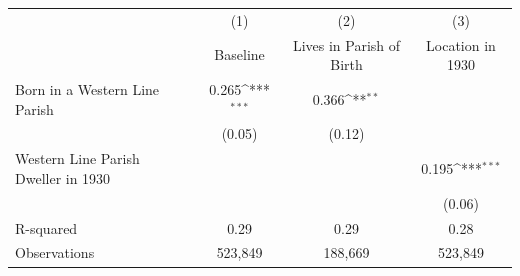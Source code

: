 {
\def\sym#1{\ifmmode^{#1}\else\(^{#1}\)\fi}
\begin{tabular}{l*{3}{c}}
\hline\hline
                    &\multicolumn{1}{c}{(1)}&\multicolumn{1}{c}{(2)}&\multicolumn{1}{c}{(3)}\\
                    &\multicolumn{1}{c}{Baseline}&\multicolumn{1}{c}{Lives in Parish of Birth}&\multicolumn{1}{c}{Location in 1930}\\
\hline
Born in a Western Line Parish&       0.265\sym{***}&       0.366\sym{**} &                     \\
                    &      (0.05)         &      (0.12)         &                     \\
Western Line Parish Dweller in 1930&                     &                     &       0.195\sym{***}\\
                    &                     &                     &      (0.06)         \\
\hline
R-squared           &        0.29         &        0.29         &        0.28         \\
Observations        &     523,849         &     188,669         &     523,849         \\
\hline\hline
\end{tabular}
}
